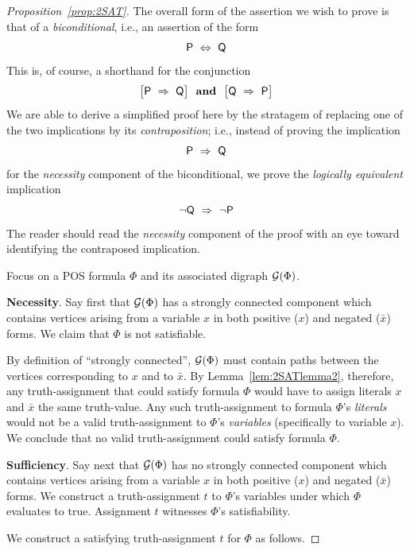 \begin{proof}[Proposition~\ref{prop:2SAT}]
The overall form of the assertion we wish to prove is that of a {\em biconditional}, i.e., an assertion of the form
\[ \mbox{\sf P} \ \Leftrightarrow \ \mbox{\sf Q} \]
This is, of course, a shorthand for the conjunction
\[  \big[ \mbox{\sf P} \ \Rightarrow \ \mbox{\sf Q} \big] \ \ 
\mbox{\bf and} \ \  
\big[ \mbox{\sf Q} \ \Rightarrow \ \mbox{\sf P} \big]
\]
We are able to derive a simplified proof here by the stratagem of replacing one of the
two implications by its {\em contraposition}; i.e., instead of proving the implication
\[ \mbox{\sf P} \ \Rightarrow \ \mbox{\sf Q} \]
for the {\em necessity} component of the biconditional, we prove the {\em logically equivalent} implication
\[  \neg \mbox{\sf Q} \ \Rightarrow \ \neg \mbox{\sf P} \]
The reader should read the {\em necessity} component of the proof with an eye toward identifying the contraposed implication.

\medskip

Focus on a POS formula $\Phi$ and its associated digraph $\mbox{$\cal G$}(\Phi)$.

\smallskip

{\bf Necessity}.
Say first that $\mbox{$\cal G$}(\Phi)$ has a strongly connected component which contains vertices arising from a variable $x$ in both positive ($x$) and negated ($\bar{x}$) forms.  We claim that $\Phi$ is not satisfiable.

By definition of ``strongly connected'', $\mbox{$\cal G$}(\Phi)$ must contain paths between the vertices corresponding to $x$ and to $\bar{x}$.  By Lemma~\ref{lem:2SATlemma2}, therefore, any truth-assignment that could satisfy formula $\Phi$ would have to assign literals $x$ and $\bar{x}$ the same truth-value.  Any such truth-assignment to formula $\Phi$'s {\em literals} would not be a valid truth-assignment to $\Phi$'s {\em variables} (specifically to variable $x$).  We conclude that no valid truth-assignment could satisfy formula $\Phi$.

\medskip

{\bf Sufficiency}.
Say next that $\mbox{$\cal G$}(\Phi)$ has no strongly connected component which contains vertices arising from a variable $x$ in both positive ($x$) and negated ($\bar{x}$) forms.  We construct a truth-assignment $t$ to $\Phi$'s variables under which $\Phi$ evaluates to {\sc true}.  Assignment $t$ witnesses $\Phi$'s satisfiability.

\smallskip

We construct a satisfying truth-assignment $t$ for $\Phi$ as follows.


\end{proof}
